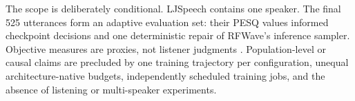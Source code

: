 The scope is deliberately conditional.  LJSpeech contains one speaker.  The
final 525 utterances form an adaptive evaluation set: their PESQ values
informed checkpoint decisions and one deterministic repair of RFWave's
inference sampler.
Objective measures are proxies, not listener judgments
\citep{rix2001pesq,taal2011stoi,saeki2022utmos}.  Population-level or causal claims are precluded by one training trajectory
per configuration, unequal architecture-native budgets, independently
scheduled training jobs, and the absence of listening or multi-speaker
experiments.
